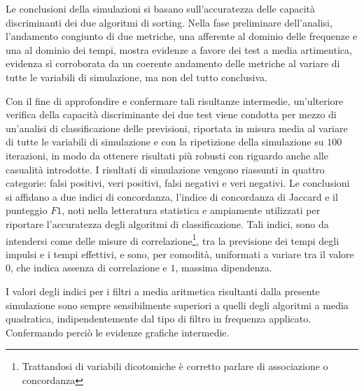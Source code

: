 \documentclass[9pt,twocolumn,twoside]{osajnl}
\begin{document}
Le conclusioni della simulazioni si basano sull'accuratezza delle capacità discriminanti dei due algoritmi di sorting. Nella fase preliminare dell'analisi, l'andamento congiunto di due metriche, una afferente al dominio delle frequenze e una al dominio dei tempi, mostra evidenze a favore dei test a media artimentica, evidenza sì corroborata da un coerente andamento delle metriche al variare di tutte le variabili di simulazione, ma non del tutto conclusiva.

Con il fine di approfondire e confermare tali risultanze intermedie, un'ulteriore verifica della capacità discriminante dei due test viene condotta per mezzo di un'analisi di classificazione delle previsioni, riportata in misura media al variare di tutte le variabili di simulazione e con la ripetizione della simulazione su $100$ iterazioni, in modo da ottenere risultati più robusti con riguardo anche alle casualità introdotte. I risultati di simulazione vengono riassunti in quattro categorie: falsi positivi, veri positivi, falsi negativi e veri negativi. Le conclusioni si affidano a due indici di concordanza, l'indice di concordanza di Jaccard e il punteggio $F1$, noti nella letteratura statistica e ampiamente utilizzati per riportare l'accuratezza degli algoritmi di classificazione. Tali indici, sono da intendersi come delle misure di correlazione\footnote{Trattandosi di variabili dicotomiche è corretto parlare di associazione o concordanza}, tra la previsione dei tempi degli impulsi e i tempi effettivi, e sono, per comodità, uniformati a variare tra il valore $0$, che indica assenza di correlazione e $1$, massima dipendenza. 

I valori degli indici per i filtri a media aritmetica risultanti dalla presente simulazione sono sempre sensibilmente superiori a quelli degli algoritmi a media quadratica, indipendentemente dal tipo di filtro in frequenza applicato. Confermando perciò le evidenze grafiche intermedie.

% 
\end{document}
